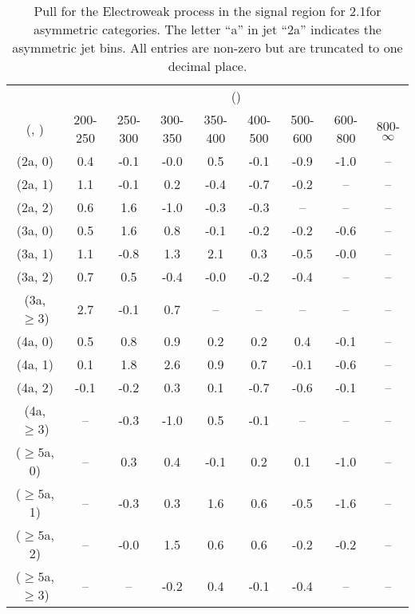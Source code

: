 \begin{table}[h!]
\tiny
\centering
\caption{Pull for the Electroweak process in the signal region for 2.1\ifb for asymmetric categories. The letter ``a'' in jet \eg ``2a''  indicates the asymmetric jet bins. All entries are non-zero but are truncated to one decimal place.\label{tab:pullsep_sig_ewk_asym}}
\begin{tabular}
{ccccccccc}
	\hline\hline
	& \multicolumn{8}{c}{\scalht (\gev)} \\ 
	 (\njet,  \nb) & 200-250 & 250-300 & 300-350 & 350-400 & 400-500 & 500-600 & 600-800 & 800-$\infty$ \\ [0.8ex] 
\hline
	(2a, 0) & 0.4 & -0.1 & -0.0 & 0.5 & -0.1 & -0.9 & -1.0 & -- \\[0.5ex] 
	(2a, 1) & 1.1 & -0.1 & 0.2 & -0.4 & -0.7 & -0.2 & -- & -- \\[0.5ex] 
	(2a, 2) & 0.6 & 1.6 & -1.0 & -0.3 & -0.3 & -- & -- & -- \\[0.5ex] 
	(3a, 0) & 0.5 & 1.6 & 0.8 & -0.1 & -0.2 & -0.2 & -0.6 & -- \\[0.5ex] 
	(3a, 1) & 1.1 & -0.8 & 1.3 & 2.1 & 0.3 & -0.5 & -0.0 & -- \\[0.5ex] 
	(3a, 2) & 0.7 & 0.5 & -0.4 & -0.0 & -0.2 & -0.4 & -- & -- \\[0.5ex] 
	(3a, $\ge3$) & 2.7 & -0.1 & 0.7 & -- & -- & -- & -- & -- \\[0.5ex] 
	(4a, 0) & 0.5 & 0.8 & 0.9 & 0.2 & 0.2 & 0.4 & -0.1 & -- \\[0.5ex] 
	(4a, 1) & 0.1 & 1.8 & 2.6 & 0.9 & 0.7 & -0.1 & -0.6 & -- \\[0.5ex] 
	(4a, 2) & -0.1 & -0.2 & 0.3 & 0.1 & -0.7 & -0.6 & -0.1 & -- \\[0.5ex] 
	(4a, $\ge3$) & -- & -0.3 & -1.0 & 0.5 & -0.1 & -- & -- & -- \\[0.5ex] 
	($\ge5$a, 0) & -- & 0.3 & 0.4 & -0.1 & 0.2 & 0.1 & -1.0 & -- \\[0.5ex] 
	($\ge5$a, 1) & -- & -0.3 & 0.3 & 1.6 & 0.6 & -0.5 & -1.6 & -- \\[0.5ex] 
	($\ge5$a, 2) & -- & -0.0 & 1.5 & 0.6 & 0.6 & -0.2 & -0.2 & -- \\[0.5ex] 
	($\ge5$a, $\ge3$) & -- & -- & -0.2 & 0.4 & -0.1 & -0.4 & -- & -- \\[0.5ex] 
	\hline
	\hline
\end{tabular}
\end{table}
